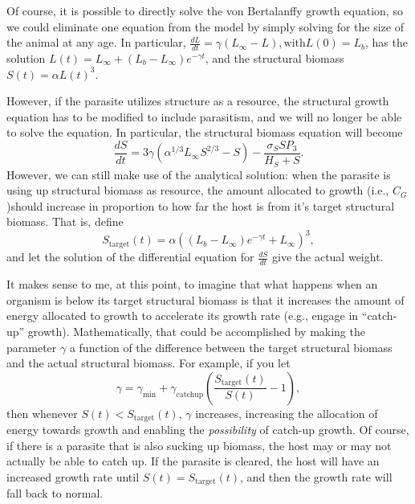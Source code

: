 \documentclass[12pt,reqno,final,pdftex]{amsart}\usepackage[]{graphicx}\usepackage[]{color}
\theoremstyle{plain}
\numberwithin{equation}{part}
\begin{document}
Of course, it is possible to directly solve the von Bertalanffy growth equation, so we could eliminate one equation from the model by simply solving for the size of the animal at any age.
In particular, $\frac{dL}{dt}=\gamma \left(L_{\infty }-L\right), \text{with} L(0)=L_b$, has the solution $L(t)=L_{\infty }+\left(L_b-L_{\infty}\right)e^{-\gamma t}$, and the structural biomass $S(t)=\alpha L(t)^3$.

However, if the parasite utilizes structure as a resource, the structural growth equation has to be modified to include parasitism, and we will no longer be able to solve the equation.
In particular, the structural biomass equation will become
\begin{equation}
\frac{dS}{dt}=3\gamma  \left(\alpha^{1/3}L_{\infty }S^{2/3}-S\right)-\frac{\sigma_S S P_3}{H_S+S}.
\end{equation}
However, we can still make use of the analytical solution: when the parasite is using up structural biomass as resource, the amount allocated to growth (i.e., $C_G$)should increase in proportion to how far the host is from it's target structural biomass.
That is, define
\begin{equation}
S_{\text{target}}(t)=\alpha \left(\left(L_b-L_{\infty }\right) e^{-\gamma  t}+L_{\infty }\right)^3,
\end{equation} and let the solution of the differential equation for $\frac{dS}{dt}$ give the actual weight.

It makes sense to me, at this point, to imagine that what happens when an organism is below its target structural biomass is that it increases the amount of energy allocated to growth to accelerate its growth rate (e.g., engage in ``catch-up'' growth).
Mathematically, that could be accomplished by making the parameter $\gamma$ a function of the difference between the target structural biomass and the actual structural biomass.
For example, if you let
\begin{equation}
\gamma =\gamma _{\min }+\gamma _{\text{catchup}}\left(\frac{S_{\text{target}}(t)}{S(t)}-1\right),
\end{equation}
then whenever $S(t)<S_{\text{target}}(t)$, $\gamma$ increases, increasing the allocation of energy towards growth and enabling the \textit{possibility} of catch-up growth.
Of course, if there is a parasite that is also sucking up biomass, the host may or may not actually be able to catch up.
If the parasite is cleared, the host will have an increased growth rate until $S(t)=S_{\text{target}}(t)$, and then the growth rate will fall back to normal.
\end{document}
